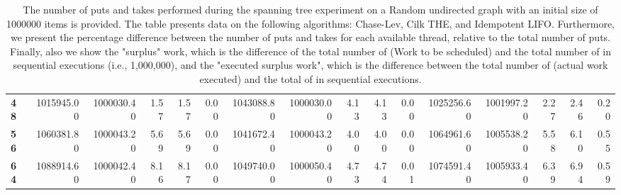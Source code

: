 \begin{table}[!ht]
{\begin{tabular}{lrrrrrrrrrrrrrrr}
\textbf{48} & 1015945.00 & 1000030.40 &           1.57 &        1.57 &                 0.00 & 1043088.80 & 1000030.00 &           4.13 &        4.13 &                 0.00 &      1025256.60 & 1001997.20 &           2.27 &        2.46 &                 0.20 \\
\textbf{56} & 1060381.80 & 1000043.20 &           5.69 &        5.69 &                 0.00 & 1041672.40 & 1000043.20 &           4.00 &        4.00 &                 0.00 &      1064961.60 & 1005538.20 &           5.58 &        6.10 &                 0.55 \\
\textbf{64} & 1088914.60 & 1000042.40 &           8.16 &        8.17 &                 0.00 & 1049740.00 & 1000050.40 &           4.73 &        4.74 &                 0.01 &      1074591.40 & 1005933.40 &           6.39 &        6.94 &                 0.59 \\
\bottomrule
\end{tabular}}
\label{difference-Random_undirected-1000000-CHASELEV-CILK-IDEMPOTENT_LIFO}
\caption{The number of puts and takes performed during the
    spanning tree experiment on a Random undirected graph with an initial size
    of 1000000 items is provided. The table presents data on the
    following algorithms: Chase-Lev, Cilk THE, and
    Idempotent LIFO. Furthermore, we present the percentage difference
    between the number of puts and takes for each available thread,
    relative to the total number of puts. Finally, also we show the
    "surplus" work, which is the difference of the total number of
    \Puts (Work to be scheduled) and the total number of \Puts in
    sequential executions (i.e., 1,000,000), and the "executed surplus
    work", which is the difference between the total number of \Takes
    (actual work executed) and the total of \Takes in sequential
    executions.}
\end{table}
